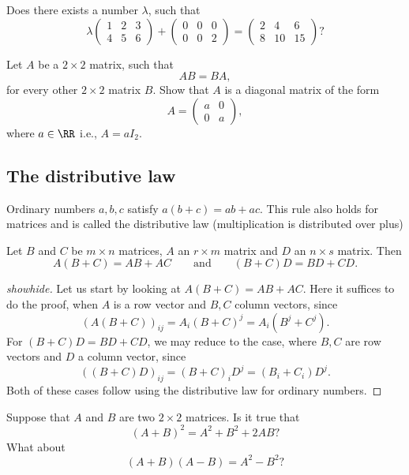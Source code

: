 \documentclass{article}
\begin{document}
\beginshex
Does there exists a number  $\lambda$, such that 
$$
\lambda 
\begin{pmatrix}
1 & 2 & 3\\
4 & 5 & 6
\end{pmatrix} 
+
\begin{pmatrix}
0 & 0 & 0\\
0 & 0 & 2
\end{pmatrix} 
= 
\begin{pmatrix}
2 & 4 & 6\\
8 & 10 & 15
\end{pmatrix}?
$$
\endshex


\beginshex
Let $A$ be a $2\times 2$ matrix, such that
$$
A B = B A,
$$
for every other $2\times 2$ matrix $B$. Show that $A$ is a diagonal matrix of the form
$$
A =
\begin{pmatrix}
  a & 0\\
  0 & a
\end{pmatrix},
$$
where $a\in \RR$ i.e., $A = a I_2$.
\endshex


\subsection{The distributive law}

Ordinary numbers $a, b, c$ satisfy
$a (b + c) = a b + a c$. This rule also holds for
matrices and is called the distributive law (multiplication
is distributed over plus)

\begin{proposition}
Let $B$ and $C$ be $m\times n$ matrices, $A$ an $r\times m$ matrix and $D$ an $n\times s$ matrix. Then
$$
A ( B + C) = A B + A C\qquad\text{and}\qquad (B + C) D = B D + C D.
$$
\end{proposition}
\begin{proof}[showhide]
  Let us start by looking at $A(B+C) = A B + A C$. 
Here it suffices to do the proof, when $A$ is a row vector and
$B, C$ column vectors, since
$$
(A (B+C))_{ij} = A_i (B+C)^j = A_i (B^j + C^j).
$$
For $(B + C) D = B D + C D$, we may reduce to the case, where
$B, C$ are row vectors and  $D$ a column vector, since
$$
((B+C) D)_{ij} = (B+C)_i D^j = (B_i + C_i) D^j.
$$
Both of these cases follow using the distributive law for ordinary numbers.
\end{proof}




\beginshex
Suppose that $A$ and $B$ are two $2\times 2$ matrices. Is it true that
$$
(A + B)^2 = A^2 + B^2 + 2 A B?
$$
What about
$$
(A + B) (A - B) = A^2 - B^2?
$$
\endshex
\end{document}
